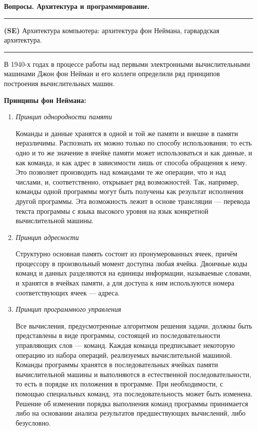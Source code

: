 \documentclass[12pt]{article}
\begin{document}
\textbf{Вопросы. Архитектура и программирование.} \\


\noindent\rule{\textwidth}{1pt}
\textbf{(SE)} Архитектура компьютера: архитектура фон Неймана, гарвардская архитектура.

\noindent\rule{\textwidth}{1pt}


В 1940-х годах в процессе работы над первыми электронными вычислительными машинами Джон фон Нейман и его коллеги определили ряд принципов построения вычислительных машин.

\textbf{Принципы фон Неймана:}

\begin{enumerate}
	\item \textit{Принцип однородности памяти}
	
	Команды и данные хранятся в одной и той же памяти и внешне в памяти неразличимы. Распознать их можно только по способу использования; то есть одно и то же значение в ячейке памяти может использоваться и как данные, и как команда, и как адрес в зависимости лишь от способа обращения к нему. Это позволяет производить над командами те же операции, что и над числами, и, соответственно, открывает ряд возможностей.  Так, например, команды одной программы могут быть получены как результат исполнения другой программы. Эта возможность лежит в основе трансляции --- перевода текста программы с языка высокого уровня на язык конкретной вычислительной машины.
	
	\item \textit{Принцип адресности}
	
	Структурно основная память состоит из пронумерованных ячеек, причём процессору в произвольный момент доступна любая ячейка. Двоичные коды команд и данных разделяются на единицы информации, называемые словами, и хранятся в ячейках памяти, а для доступа к ним используются номера соответствующих ячеек --- адреса.
	
	\item \textit{Принцип программного управления}
	
	
Все вычисления, предусмотренные алгоритмом решения задачи, должны быть представлены в виде программы, состоящей из последовательности управляющих слов --- команд. Каждая команда предписывает некоторую операцию из набора операций, реализуемых вычислительной машиной. Команды программы хранятся в последовательных ячейках памяти вычислительной машины и выполняются в естественной последовательности, то есть в порядке их положения в программе. При необходимости, с помощью специальных команд, эта последовательность может быть изменена. Решение об изменении порядка выполнения команд программы принимается либо на основании анализа результатов предшествующих вычислений, либо безусловно.
	
\end{enumerate}
\end{document}
